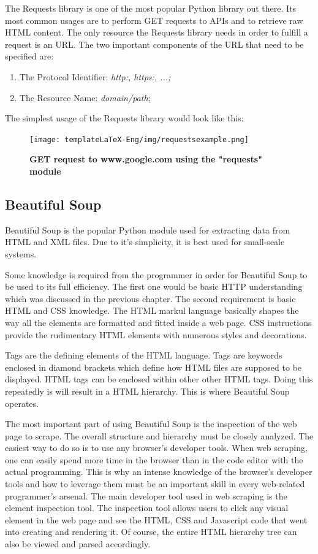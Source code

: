 \documentclass[12pt,a4paper,twoside]{report}
\begin{document}
The Requests library is one of the most popular Python library out there. Its most common usages are to perform GET requests to APIs and to retrieve raw HTML content. The only resource the Requests library needs in order to fulfill a request is an URL. The two important components of the URL that need to be specified are: 
\begin{enumerate}
    \item The Protocol Identifier: \textit{http:, https:, ...;}
    \item The Resource Name: \textit{domain/path};
\end{enumerate}

The simplest usage of the Requests library would look like this:
\begin{figure}[H]
    \begin{center}
        \texttt{[image: templateLaTeX-Eng/img/requestsexample.png]}
        \caption{\bf GET request to www.google.com using the "requests" module}
    \end{center}
\end{figure}

\subsection{Beautiful Soup}
Beautiful Soup is the popular Python module used for extracting data from HTML and XML files. Due to it's simplicity, it is best used for small-scale systems.

Some knowledge is required from the programmer in order for Beautiful Soup to be used to its full efficiency. The first one would be basic HTTP understanding which was discussed in the previous chapter. The second requirement is basic HTML and CSS knowledge. The HTML markul language basically shapes the way all the elements are formatted and fitted inside a web page. CSS instructions provide the rudimentary HTML elements with numerous styles and decorations.

Tags are the defining elements of the HTML language. Tags are keywords enclosed in diamond brackets which define how HTML files are supposed to be displayed. HTML tags can be enclosed within other other HTML tags. Doing this repeatedly is will result in a HTML hierarchy. This is where Beautiful Soup operates.

The most important part of using Beautiful Soup is the inspection of the web page to scrape. The overall structure and hierarchy must be closely analyzed. The easiest way to do so is to use any browser's developer tools. When web scraping, one can easily spend more time in the browser than in the code editor with the actual programming. This is why an intense knowledge of the browser's developer tools and how to leverage them must be an important skill in every web-related programmer's arsenal. The main developer tool used in web scraping is the element inspection tool. The inspection tool allows users to click any visual element in the web page and see the HTML, CSS and Javascript code that went into creating and rendering it. Of course, the entire HTML hierarchy tree can also be viewed and parsed accordingly. 
\end{document}
